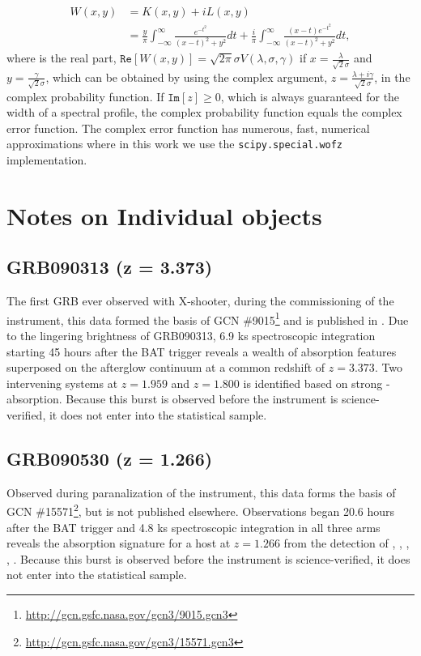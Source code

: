 \documentclass{aa}    %
\begin{document}
\begin{equation} 
\begin{split}
W(x, y)  
& = K(x, y) + i L(x, y) \\
& = \frac{y}{\pi}  \int_{-\infty}^{\infty} \frac{e^{- t^2 }}{(x -  t)^2 +y^2} dt  + \frac{i}{\pi}  \int_{-\infty}^{\infty} \frac{(x - t)e^{- t^2 }}{(x -  t)^2 +y^2} dt,
\end{split}
\end{equation}
where is the real part, $\mathtt{Re}[W(x, y)] =  \sqrt{2 \pi} \sigma V(\lambda,\sigma, \gamma)$ if $x = \frac{\lambda}{\sqrt{2} \sigma}$ and $y = \frac{\gamma}{\sqrt{2} \sigma}$, which can be obtained by using the complex argument, $z = \frac{\lambda + i\gamma}{\sqrt{2} \sigma}$, in the complex probability function. If $\mathtt{Im}[z] \geq 0$, which is always guaranteed for the width of a spectral profile, the complex probability function equals the complex error function. The complex error function has numerous, fast, numerical approximations where in this work we use the \texttt{scipy.special.wofz} \citep{scipy} implementation.


\section{Notes on Individual objects} \label{notes}

\subsection{GRB090313 (z = 3.373)}
The first GRB ever observed with X-shooter, during the commissioning of the
instrument, this data formed the basis of GCN
\#9015\footnote{\url{http://gcn.gsfc.nasa.gov/gcn3/9015.gcn3}} and is published
in \citet{DeUgartePostigo2010}. Due to the lingering brightness of GRB090313,
6.9 ks spectroscopic integration starting 45 hours after the BAT trigger reveals
a wealth of absorption features superposed on the afterglow continuum at a
common redshift of $z = 3.373$. Two intervening systems at $z = 1.959$ and $z =
1.800$ is identified based on strong \mgii-absorption. Because this burst is
observed before the instrument is science-verified, it does not enter into the
statistical sample.

\subsection{GRB090530 (z = 1.266)}
Observed during paranalization of the instrument, this data forms the basis of
GCN \#15571\footnote{\url{http://gcn.gsfc.nasa.gov/gcn3/15571.gcn3}}, but is not
published elsewhere. Observations began 20.6 hours after the BAT trigger and 4.8
ks spectroscopic integration in all three arms reveals the absorption signature
for a host at $z = 1.266$ from the detection of \mgii, \mgi, \SIii, \feii,
\aliii. Because this burst is observed before the instrument is
science-verified, it does not enter into the statistical sample.
\end{document}
